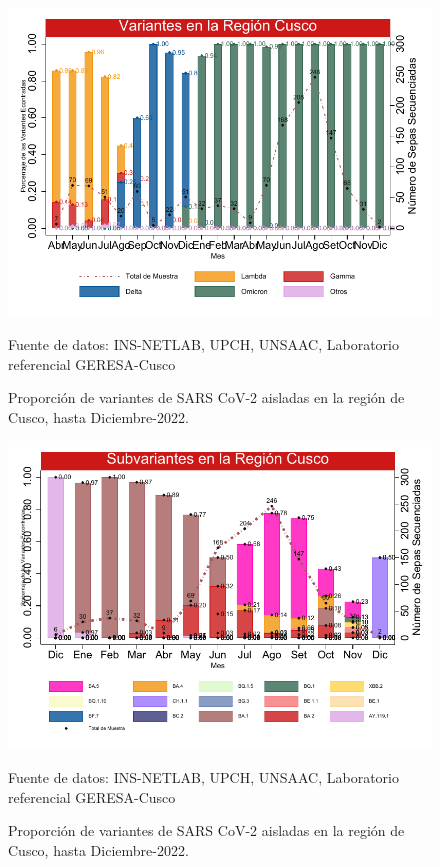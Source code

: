 \documentclass[12pt,a4paper,openany]{book}
\begin{document}
	\begin{figure}[h]
		\caption{Proporción de variantes de SARS CoV-2 aisladas en la región de Cusco, hasta Diciembre-2022.}\label{fig:variantes}
		\begin{center}
			\includegraphics[width=0.85\linewidth]{../figuras/variantes.pdf}
		\end{center}
		{\footnotesize {Fuente de datos: INS-NETLAB, UPCH, UNSAAC, Laboratorio referencial GERESA-Cusco}}
	\end{figure}

	\begin{figure}[h]
	\caption{Proporción de variantes de SARS CoV-2 aisladas en la región de Cusco, hasta Diciembre-2022. }\label{fig:subvariantes}
	\begin{center}
		\includegraphics[width=0.85\linewidth]{../figuras/subvariantes.pdf}
	\end{center}
	{\footnotesize {Fuente de datos: INS-NETLAB, UPCH, UNSAAC, Laboratorio referencial GERESA-Cusco}}
\end{figure}
	
\end{document}
